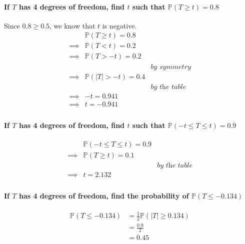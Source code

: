 \documentclass{article}
\renewcommand{\P}{\mathbb{P}}
\begin{document}
\paragraph{If \(T\) has 4 degrees of freedom, find \(t\) such that \(\P (T \geq t) = 0.8\)\\}
Since \(0.8 \geq 0.5\), we know that \(t\) is negative.
\begin{align*}
           & \P (T \geq t) = 0.8                         \\
  \implies & \P (T < t) = 0.2                            \\
  \implies & \P (T > -t) = 0.2                           \\
           &                     & \textit{by symmetry}  \\
  \implies & \P (|T| > -t) = 0.4                         \\
           &                     & \textit{by the table} \\
  \implies & -t = 0.941                                  \\
  \implies & t = -0.941                                  \\
\end{align*}

\paragraph{If \(T\) has 4 degrees of freedom, find \(t\) such that \(\P (-t \leq T \leq t) = 0.9\)\\}
\begin{align*}
           & \P (-t \leq T \leq t) = 0.9                         \\
  \implies & \P (T \geq t) = 0.1                                 \\
           &                             & \textit{by the table} \\
  \implies & t = 2.132                                           \\
\end{align*}

\paragraph{If \(T\) has 4 degrees of freedom, find the probability of \(\P (T \leq -0.134)\)\\}
\begin{align*}
  \P (T \leq -0.134)
   & = \frac{1}{2} \P (|T| \geq 0.134) \\
   & = \frac{0.9}{2}                   \\
   & = 0.45                            \\
\end{align*}
\end{document}
